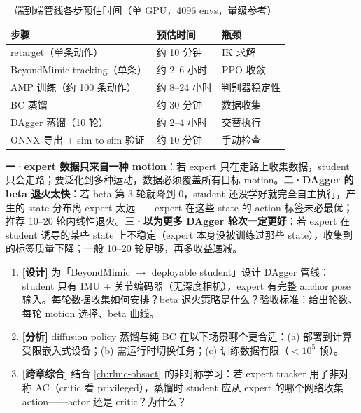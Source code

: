 \begin{table}[ht]
\centering
\small
\caption{端到端管线各步预估时间（单 GPU，4096 envs，量级参考）}
\label{tab:rlmc-imit-bc-time}
\begin{tabular}{@{}lll@{}}
\toprule
步骤 & 预估时间 & 瓶颈 \\
\midrule
retarget（单条动作） & 约 10 分钟 & IK 求解 \\
BeyondMimic tracking（单条） & 约 2--6 小时 & PPO 收敛 \\
AMP 训练（约 100 条动作） & 约 8--24 小时 & 判别器稳定性 \\
BC 蒸馏 & 约 30 分钟 & 数据收集 \\
DAgger 蒸馏（10 轮） & 约 2--4 小时 & 交替执行 \\
ONNX 导出 + sim-to-sim 验证 & 约 10 分钟 & 手动检查 \\
\bottomrule
\end{tabular}
\end{table}

\begin{pitfall}
\textbf{一·expert 数据只来自一种 motion}：若 expert 只在走路上收集数据，student 只会走路；要泛化到多种运动，数据必须覆盖所有目标 motion。\textbf{二·DAgger 的 beta 退火太快}：若 beta 第 3 轮就降到 0，student 还没学好就完全自主执行，产生的 state 分布离 expert 太远——expert 在这些 state 的 action 标签未必最优；推荐 10--20 轮内线性退火。\textbf{三·以为更多 DAgger 轮次一定更好}：若 expert 在 student 诱导的某些 state 上不稳定（expert 本身没被训练过那些 state），收集到的标签质量下降；一般 10--20 轮足够，再多收益递减。
\end{pitfall}

\begin{practice}[练习·蒸馏]
\begin{enumerate}
  \item \textbf{[设计]} 为「BeyondMimic $\to$ deployable student」设计 DAgger 管线：student 只有 IMU + 关节编码器（无深度相机），expert 有完整 anchor pose 输入。每轮数据收集如何安排？beta 退火策略是什么？验收标准：给出轮数、每轮 motion 选择、beta 曲线。
  \item \textbf{[分析]} diffusion policy 蒸馏与纯 BC 在以下场景哪个更合适：(a) 部署到计算受限嵌入式设备；(b) 需运行时切换任务；(c) 训练数据有限（$<10^5$ 帧）。
  \item \textbf{[跨章综合]} 结合 \cref{ch:rlmc-obsact} 的非对称学习：若 expert tracker 用了非对称 AC（critic 看 privileged），蒸馏时 student 应从 expert 的哪个网络收集 action——actor 还是 critic？为什么？
\end{enumerate}
\end{practice}

